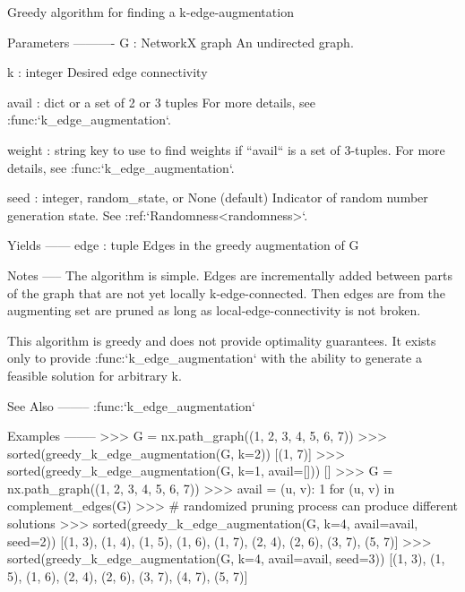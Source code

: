\begin{DoxyVerb}Greedy algorithm for finding a k-edge-augmentation

Parameters
----------
G : NetworkX graph
   An undirected graph.

k : integer
    Desired edge connectivity

avail : dict or a set of 2 or 3 tuples
    For more details, see :func:`k_edge_augmentation`.

weight : string
    key to use to find weights if ``avail`` is a set of 3-tuples.
    For more details, see :func:`k_edge_augmentation`.

seed : integer, random_state, or None (default)
    Indicator of random number generation state.
    See :ref:`Randomness<randomness>`.

Yields
------
edge : tuple
    Edges in the greedy augmentation of G

Notes
-----
The algorithm is simple. Edges are incrementally added between parts of the
graph that are not yet locally k-edge-connected. Then edges are from the
augmenting set are pruned as long as local-edge-connectivity is not broken.

This algorithm is greedy and does not provide optimality guarantees. It
exists only to provide :func:`k_edge_augmentation` with the ability to
generate a feasible solution for arbitrary k.

See Also
--------
:func:`k_edge_augmentation`

Examples
--------
>>> G = nx.path_graph((1, 2, 3, 4, 5, 6, 7))
>>> sorted(greedy_k_edge_augmentation(G, k=2))
[(1, 7)]
>>> sorted(greedy_k_edge_augmentation(G, k=1, avail=[]))
[]
>>> G = nx.path_graph((1, 2, 3, 4, 5, 6, 7))
>>> avail = {(u, v): 1 for (u, v) in complement_edges(G)}
>>> # randomized pruning process can produce different solutions
>>> sorted(greedy_k_edge_augmentation(G, k=4, avail=avail, seed=2))
[(1, 3), (1, 4), (1, 5), (1, 6), (1, 7), (2, 4), (2, 6), (3, 7), (5, 7)]
>>> sorted(greedy_k_edge_augmentation(G, k=4, avail=avail, seed=3))
[(1, 3), (1, 5), (1, 6), (2, 4), (2, 6), (3, 7), (4, 7), (5, 7)]
\end{DoxyVerb}
 \mbox{\label{namespacenetworkx_1_1algorithms_1_1connectivity_1_1edge__augmentation_a9edaf25287039801db3e652e682b99fa}} 
